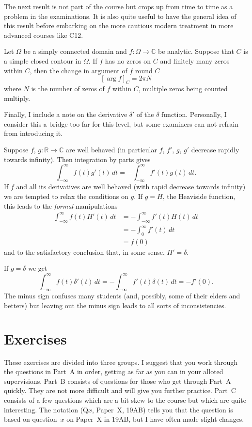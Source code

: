 The next result is not part of the course but crops
up from time to time as a problem in the examinations.
It is also quite useful to have the general idea
of this result before embarking on the more
cautious modern treatment in more advanced courses like C12.
\begin{theorem} 
Let $\Omega$
be a simply connected domain and $f:\Omega\rightarrow{\mathbb C}$
be analytic. Suppose that
$C$ is a simple closed contour in $\Omega$.
If $f$ has no zeros on $C$ and finitely many
zeros within $C$, then the change in argument of $f$
round $C$
\[[\arg f]_{C}=2\pi N\]
where $N$ is the number of zeros of $f$ within $C$,
multiple zeros being counted multiply.
\end{theorem}

Finally, I include a note on the derivative $\delta'$
of the $\delta$ function. Personally, I consider this
a bridge too far for this level, but some examiners
can not refrain from introducing it. 

Suppose
$f$, $g:{\mathbb R}\rightarrow{\mathbb C}$ are well
behaved (in particular $f$, $f'$, $g$, $g'$ decrease
rapidly towards infinity). Then integration by
parts gives
\[\int_{-\infty}^{\infty}f(t)g'(t)\,dt
=-\int_{-\infty}^{\infty}f'(t)g(t)\,dt.\]
If $f$ and all its derivatives are well behaved (with rapid
decrease towards infinity) we are tempted to relax the conditions
on $g$. If $g=H$, the Heaviside function, this 
leads to the \emph{formal} manipulations
\begin{align*}
\int_{-\infty}^{\infty}f(t)H'(t)\,dt
&=-\int_{-\infty}^{\infty}f'(t)H(t)\,dt\\
&=-\int_{0}^{\infty}f'(t)\,dt\\
&=f(0)
\end{align*}
and to the satisfactory conclusion that, in
some sense, $H'=\delta$.

If $g=\delta$ we get
\[\int_{-\infty}^{\infty}f(t)\delta'(t)\,dt
=-\int_{-\infty}^{\infty}f'(t)\delta(t)\,dt=-f'(0).\]
The minus sign confuses many students (and, possibly,
some of their elders and betters) but leaving out the 
minus sign leads to all sorts of inconsistencies.
\section{Exercises} These exercises are divided into
three groups. I suggest that you work through the
questions in Part~A in order, getting as far as you
can in your alloted supervisions. Part~B consists
of questions for those who get through Part~A quickly.
They are not more difficult and will give you
further practice. Part~C consists of a few questions
which are a bit skew to the course but which
are quite interesting. The notation (Q$x$, Paper~X, 19AB)
tells you that the question is based on question~$x$
on Paper~X in 19AB, but I have often made slight changes. 

